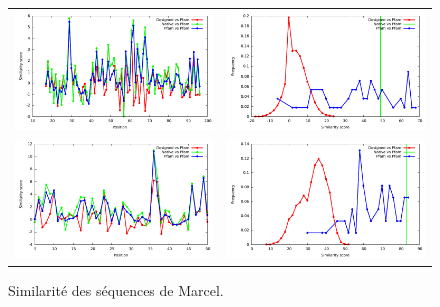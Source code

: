 \documentclass[a4paper,12pt]{article}
\begin{document}
   \begin{figure}[t]
     \centering
     \begin{tabular}{cc}
       \includegraphics[width=8.45cm]{marcel_seq/1QAU/similarity_bypos.pdf} &
       \includegraphics[width=8.45cm]{marcel_seq/1QAU/similarity_byseq_frequency.pdf} \\
       \includegraphics[width=8.45cm]{marcel_seq/1UTI/similarity_bypos.pdf} &
       \includegraphics[width=8.45cm]{marcel_seq/1UTI/similarity_byseq_frequency.pdf} \\

     \end{tabular}

     \caption{Similarité des séquences de Marcel.}

   \end{figure}
\end{document}
